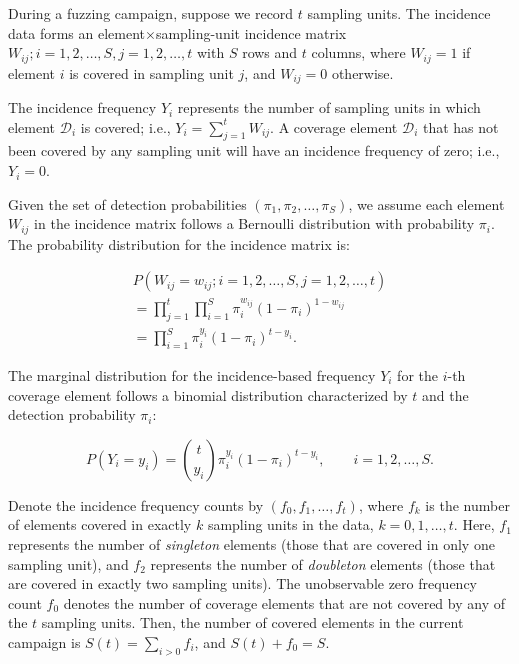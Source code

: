 \documentclass[conference]{IEEEtran}
\begin{document}
During a fuzzing campaign, suppose we record $t$ sampling units. The incidence data forms an element$\times$sampling-unit incidence matrix ${W_{ij};i=1,2,\dots,S,j=1,2,\dots,t}$ with $S$ rows and $t$ columns, where $W_{ij} = 1$ if element $i$ is covered in sampling unit $j$, and $W_{ij} = 0$ otherwise.

The incidence frequency $Y_i$ represents the number of sampling units in which element $\mathcal{D}_i$ is covered; i.e., $Y_i=\sum_{j=1}^{t}W_{ij}$. A coverage element $\mathcal{D}_i$ that has not been covered by any sampling unit will have an incidence frequency of zero; i.e., $Y_i=0$.

Given the set of detection probabilities $(\pi_1,\pi_2,\dots,\pi_S)$, we assume each element $W_{ij}$ in the incidence matrix follows a Bernoulli distribution with probability $\pi_i$. The probability distribution for the incidence matrix is:

\begin{equation}
    \begin{split}
        P(W_{ij}=w_{ij};i=1,2,\dots,S,j=1,2,\dots,t) \\
        = \prod_{j=1}^{t}\prod_{i=1}^{S}\pi_i^{w_{ij}}(1-\pi_i)^{1-w_{ij}} \\
        = \prod_{i=1}^{S}\pi_i^{y_i}(1-\pi_i)^{t-y_i}.
    \end{split}
\end{equation}

The marginal distribution for the incidence-based frequency $Y_i$ for the $i$-th coverage element follows a binomial distribution characterized by $t$ and the detection probability $\pi_i$:

\begin{equation}
    P(Y_i=y_i) = \binom{t}{y_i}\pi_i^{y_i}(1-\pi_i)^{t-y_i}, \qquad i=1,2,\dots,S.
\end{equation}

Denote the incidence frequency counts by $(f_0, f_1, \dots, f_t)$, where $f_k$ is the number of elements covered in exactly $k$ sampling units in the data, $k=0,1,\dots,t$. Here, $f_1$ represents the number of \emph{singleton} elements (those that are covered in only one sampling unit), and $f_2$ represents the number of \emph{doubleton} elements (those that are covered in exactly two sampling units). The unobservable zero frequency count $f_0$ denotes the number of coverage elements that are not covered by any of the $t$ sampling units. Then, the number of covered elements in the current campaign is $S(t)=\sum_{i>0}f_i$, and $S(t)+f_0=S$.
\end{document}

